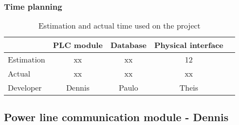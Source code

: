 \subsubsection{Time planning}
\begin{table}[H]
\centering
	\begin{tabular}{|l|c|c|c|c|}
		\hline
		~			& PLC module	& Database	& Physical interface\\ \hline
		Estimation	& xx			& xx		& 12				\\
		Actual		& xx			& xx		& xx				\\
		Developer	& Dennis		& Paulo		& Theis				\\
		\hline
	\end{tabular}
	\caption{Estimation and actual time used on the project}
\end{table}
\subsection{Power line communication module - Dennis}
%			
%					
%	
%	
%	
%	
%	
%	
%	

